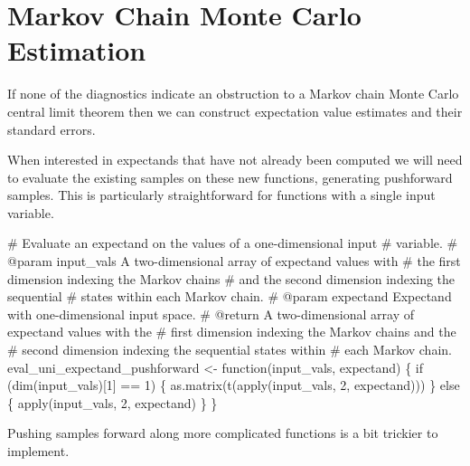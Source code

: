 \documentclass[
  letterpaper,
  DIV=11,
  numbers=noendperiod]{scrartcl}
\newenvironment{Shaded}{\begin{snugshade}}{\end{snugshade}}
\newcommand{\BuiltInTok}[1]{\textcolor[rgb]{0.00,0.23,0.31}{#1}}
\newcommand{\CommentTok}[1]{\textcolor[rgb]{0.37,0.37,0.37}{#1}}
\newcommand{\ControlFlowTok}[1]{\textcolor[rgb]{0.00,0.23,0.31}{#1}}
\newcommand{\DecValTok}[1]{\textcolor[rgb]{0.68,0.00,0.00}{#1}}
\newcommand{\ImportTok}[1]{\textcolor[rgb]{0.00,0.46,0.62}{#1}}
\newcommand{\NormalTok}[1]{\textcolor[rgb]{0.00,0.23,0.31}{#1}}
\newcommand{\OperatorTok}[1]{\textcolor[rgb]{0.37,0.37,0.37}{#1}}
\begin{document}
\section{Markov Chain Monte Carlo
Estimation}\label{markov-chain-monte-carlo-estimation}

If none of the diagnostics indicate an obstruction to a Markov chain
Monte Carlo central limit theorem then we can construct expectation
value estimates and their standard errors.

When interested in expectands that have not already been computed we
will need to evaluate the existing samples on these new functions,
generating pushforward samples. This is particularly straightforward for
functions with a single input variable.

\begin{Shaded}
\begin{Highlighting}[]
\CommentTok{\# Evaluate an expectand on the values of a one{-}dimensional input}
\CommentTok{\# variable.}
\CommentTok{\# @param input\_vals A two{-}dimensional array of expectand values with}
\CommentTok{\#                   the first dimension indexing the Markov chains}
\CommentTok{\#                   and the second dimension indexing the sequential}
\CommentTok{\#                   states within each Markov chain.}
\CommentTok{\# @param expectand Expectand with one{-}dimensional input space.}
\CommentTok{\# @return A two{-}dimensional array of expectand values with the }
\CommentTok{\#         first dimension indexing the Markov chains and the }
\CommentTok{\#         second dimension indexing the sequential states within }
\CommentTok{\#         each Markov chain.}
\NormalTok{eval\_uni\_expectand\_pushforward }\OperatorTok{\textless{}{-}}\NormalTok{ function(input\_vals, expectand) \{}
  \ControlFlowTok{if}\NormalTok{ (dim(input\_vals)[}\DecValTok{1}\NormalTok{] }\OperatorTok{==} \DecValTok{1}\NormalTok{) \{}
    \ImportTok{as}\NormalTok{.matrix(t(}\BuiltInTok{apply}\NormalTok{(input\_vals, }\DecValTok{2}\NormalTok{, expectand)))}
\NormalTok{  \} }\ControlFlowTok{else}\NormalTok{ \{}
    \BuiltInTok{apply}\NormalTok{(input\_vals, }\DecValTok{2}\NormalTok{, expectand)}
\NormalTok{  \}}
\NormalTok{\}}
\end{Highlighting}
\end{Shaded}

Pushing samples forward along more complicated functions is a bit
trickier to implement.
\end{document}
